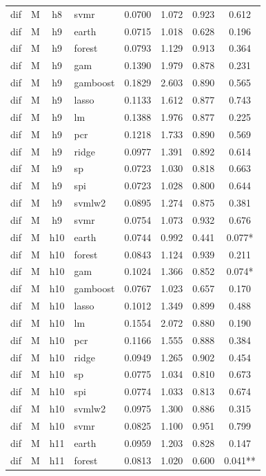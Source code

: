 \begin{ThreePartTable}
\begin{longtable}[t]{llclcccc}
dif & M & h8 & svmr & 0.0700 & 1.072 & 0.923 & 0.612\\
\addlinespace
dif & M & h9 & earth & 0.0715 & 1.018 & 0.628 & 0.196\\
dif & M & h9 & forest & 0.0793 & 1.129 & 0.913 & 0.364\\
dif & M & h9 & gam & 0.1390 & 1.979 & 0.878 & 0.231\\
dif & M & h9 & gamboost & 0.1829 & 2.603 & 0.890 & 0.565\\
dif & M & h9 & lasso & 0.1133 & 1.612 & 0.877 & 0.743\\
dif & M & h9 & lm & 0.1388 & 1.976 & 0.877 & 0.225\\
dif & M & h9 & pcr & 0.1218 & 1.733 & 0.890 & 0.569\\
dif & M & h9 & ridge & 0.0977 & 1.391 & 0.892 & 0.614\\
dif & M & h9 & sp & 0.0723 & 1.030 & 0.818 & 0.663\\
dif & M & h9 & spi & 0.0723 & 1.028 & 0.800 & 0.644\\
dif & M & h9 & svmlw2 & 0.0895 & 1.274 & 0.875 & 0.381\\
dif & M & h9 & svmr & 0.0754 & 1.073 & 0.932 & 0.676\\
\addlinespace
dif & M & h10 & earth & 0.0744 & 0.992 & 0.441 & 0.077*\\
dif & M & h10 & forest & 0.0843 & 1.124 & 0.939 & 0.211\\
dif & M & h10 & gam & 0.1024 & 1.366 & 0.852 & 0.074*\\
dif & M & h10 & gamboost & 0.0767 & 1.023 & 0.657 & 0.170\\
dif & M & h10 & lasso & 0.1012 & 1.349 & 0.899 & 0.488\\
dif & M & h10 & lm & 0.1554 & 2.072 & 0.880 & 0.190\\
dif & M & h10 & pcr & 0.1166 & 1.555 & 0.888 & 0.384\\
dif & M & h10 & ridge & 0.0949 & 1.265 & 0.902 & 0.454\\
dif & M & h10 & sp & 0.0775 & 1.034 & 0.810 & 0.673\\
dif & M & h10 & spi & 0.0774 & 1.033 & 0.813 & 0.674\\
dif & M & h10 & svmlw2 & 0.0975 & 1.300 & 0.886 & 0.315\\
dif & M & h10 & svmr & 0.0825 & 1.100 & 0.951 & 0.799\\
\addlinespace
dif & M & h11 & earth & 0.0959 & 1.203 & 0.828 & 0.147\\
dif & M & h11 & forest & 0.0813 & 1.020 & 0.600 & 0.041**\\

\end{longtable}
\end{ThreePartTable}
